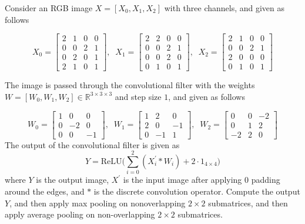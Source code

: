 \documentclass{article}
\begin{document}
    \begin{example}
        Consider an RGB image $X = [X_0, X_1, X_2]$ with three channels, and given as follows 

        \begin{equation}
          X_0 = \begin{bmatrix} 2 & 1 & 0 & 0 \\ 0 & 0 & 2 & 1 \\ 0 & 2 & 0 & 1 \\ 2 & 1 & 0 & 1 \end{bmatrix}, \;\; 
          X_1 = \begin{bmatrix} 2 & 2 & 0 & 0 \\ 0 & 0 & 2 & 1 \\ 0 & 0 & 2 & 0 \\ 0 & 1 & 0 & 1 \end{bmatrix}, \;\; 
          X_2 = \begin{bmatrix} 2 & 1 & 0 & 0 \\ 0 & 0 & 2 & 1 \\ 2 & 0 & 0 & 0 \\ 0 & 1 & 0 & 1 \end{bmatrix}
          \label{eq:tarokh_conv_exercise}
        \end{equation}
        
        The image is passed through the convolutional filter with the weights $W = [W_0, W_1, W_2] \in \mathbb{R}^{3 \times 3 \times 3}$ and step size $1$, and given as follows 

        \begin{equation}
          W_0 = \begin{bmatrix} 1 & 0 & 0 \\ 0 & -2 & 0 \\ 0 & 0 & -1 \end{bmatrix}, \;\; 
          W_1 = \begin{bmatrix} 1 & 2 & 0 \\ 2 & 0 & - 1 \\ 0 & -1 & 1 \end{bmatrix}, \;\; 
          W_2 = \begin{bmatrix} 0 & 0 & -2 \\ 0 & 1 & 2 \\ -2 & 2 & 0 \end{bmatrix} 
          \label{eq:tarokh_conv_exercise2}
        \end{equation}   
        The output of the convolutional filter is given as 
        \[Y = \mathrm{ReLU} \bigg( \sum_{i=0}^2 (X_i^\prime \ast W_i) + 2 \cdot 1_{4 \times 4}\bigg)\]
        where $Y$ is the output image, $X^\prime$ is the input image after applying $0$ padding around the edges, and $\ast$ is the discrete convolution operator. Compute the output $Y$, and then apply max pooling on nonoverlapping $2 \times 2$ submatrices, and then apply average pooling on non-overlapping $2 \times 2$ submatrices. 
    \end{example}
\end{document}
